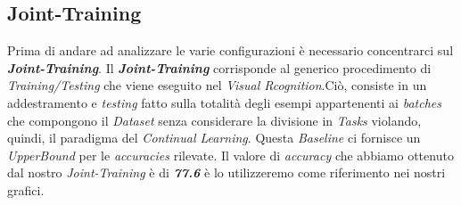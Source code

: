 \subsection{Joint-Training}
Prima di andare ad analizzare le varie configurazioni è necessario concentrarci sul \textbf{\textit{Joint-Training}}.
Il \textbf{\textit{Joint-Training}} corrisponde al generico procedimento di \textit{Training/Testing} che viene eseguito nel \textit{Visual Rcognition}.Ciò, consiste in un addestramento e \textit{testing} fatto sulla totalità degli esempi appartenenti ai \textit{batches} che compongono il \textit{Dataset} senza considerare la divisione in \textit{Tasks} violando, quindi, il paradigma del \textit{Continual Learning}. Questa \textit{Baseline} ci fornisce un \textit{UpperBound} per le \textit{accuracies} rilevate.
Il valore di \textit{accuracy} che abbiamo ottenuto dal nostro \textit{Joint-Training} è di \textit{\textbf{77.6}} è lo utilizzeremo come riferimento nei nostri grafici. 
